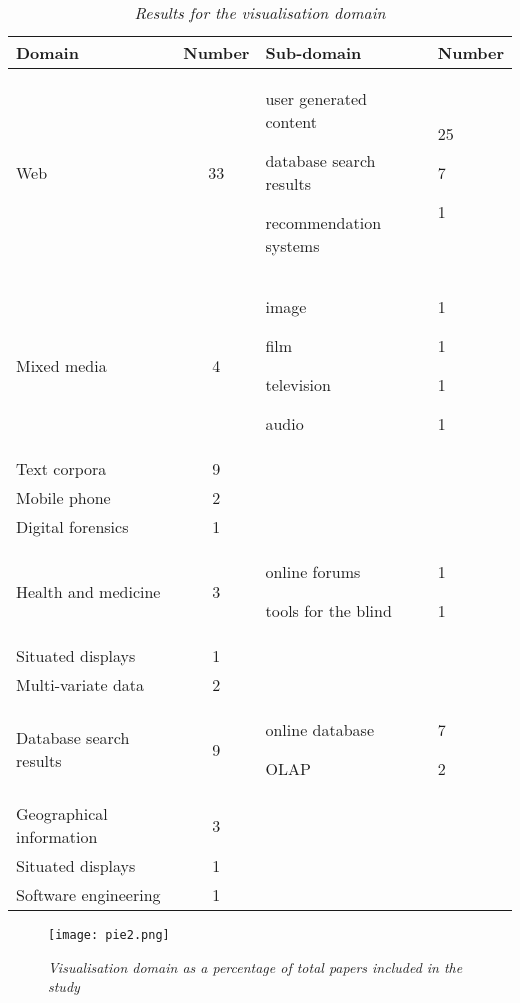 \begin{table*}
\centering
\caption{\textit{Results for the visualisation domain}}
\begin{tabular}{|l|c|p{5cm}|x{2cm}|} \hline
\textbf{Domain}&\textbf{Number}&\textbf{Sub-domain}&\textbf{Number}\\ \hline
Web&33&user generated content\par database search results\par  recommendation systems&25\par 7 \par 1\\
Mixed media&4&image\par film \par television\par audio&1\par 1\par 1\par 1\\
Text corpora&9&&\\
Mobile phone&2&&\\
Digital forensics&1&&\\
Health and medicine&3&online forums\par tools for the blind&1\par 1\\
Situated displays&1&&\\
Multi-variate data&2&&\\
Database search results&9&online database\par OLAP&7\par 2\\
Geographical information&3&&\\
Situated displays&1&&\\
Software engineering&1&&\\
\hline\end{tabular}
\label{tab:domain}
\end{table*}

\begin{figure}[!htb]
\texttt{[image: pie2.png]}
\caption{\textit{Visualisation domain as a percentage of total papers included in the study}}
\label{fig:pie2}
\end{figure}
